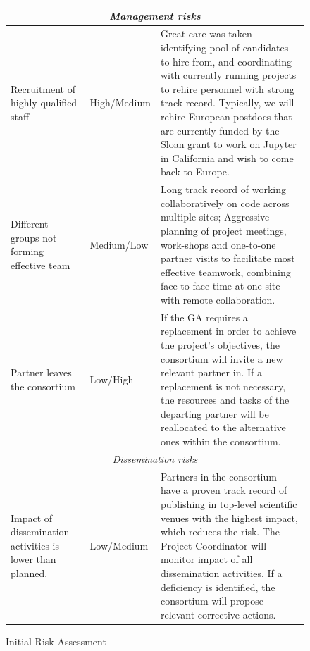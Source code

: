 \begin{figure}
\begin{center}
\begin{tabular}{|m{}|m{}|m{}|}
  \multicolumn{3}{|c|}{
    \textit{Management risks}
  }
  \\\hline

  Recruitment of highly qualified staff & High/Medium &
  Great care was taken identifying pool of candidates to hire from,
  and coordinating with currently running projects to rehire personnel
  with strong track record. Typically, we will rehire European
  postdocs that are currently funded by the Sloan grant to work on
  Jupyter in California and wish to come back to Europe.\\\hline

  Different groups not forming effective team & Medium/Low & Long
  track record of working collaboratively on code across multiple
  sites; Aggressive planning of project meetings, work-shops and
  one-to-one partner visits to facilitate most effective teamwork,
  combining face-to-face time at one site with remote
  collaboration.\\\hline

  Partner leaves the consortium & Low/High & If the GA requires a replacement
  in order to achieve the project's objectives, the consortium will invite a new
  relevant partner in. If a replacement is not necessary, the resources and tasks
  of the departing partner will be reallocated to the alternative ones within the
  consortium.
  \\\hline

  \multicolumn{3}{|c|}{
    \textit{Dissemination risks}
  }
  \\\hline

  Impact of dissemination activities is lower than planned. & Low/Medium &
  Partners in the consortium have a proven track record of publishing in top-level
  scientific venues with the highest impact, which reduces the risk. The Project Coordinator
  will monitor impact of all dissemination activities. If a deficiency is identified, the consortium
  will propose relevant corrective actions.\\\hline

  \end{tabular}
\end{center}
\caption{\label{risk-table}Initial Risk Assessment}
\end{figure}
\fi




